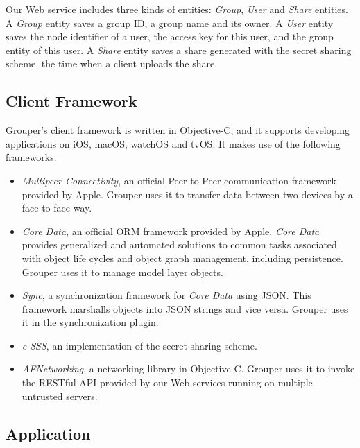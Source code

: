 \documentclass[twocolumn,10pt]{article}
\begin{document}
Our Web service includes three kinds of entities: \emph{Group}, \emph{User} and \emph{Share} entities. 
A \emph{Group} entity saves a group ID, a group name and its owner. 
A \emph{User} entity saves the node identifier of a user, the access key for this user, and the group entity of this user. 
A \emph{Share} entity saves a share generated with the secret sharing scheme, the time when a client uploads the share. 

\subsection{Client Framework}

Grouper's client framework is written in Objective-C, and it supports developing applications on iOS, macOS, watchOS and tvOS.
It makes use of the following frameworks.   

\begin{itemize}
	\setlength{\itemsep}{1pt}
	\setlength{\parskip}{0pt}
	\setlength{\parsep}{0pt}
	\item 
	\emph{Multipeer Connectivity}\cite{mc},  an official Peer-to-Peer communication framework provided by Apple. 
	Grouper uses it to transfer data between two devices by a face-to-face way.
	\item 
	\emph{Core Data}\cite{coredata}, an official ORM framework provided by Apple.
	\emph{Core Data} provides generalized and automated solutions to common tasks associated with object life cycles and object graph management, including persistence. 
	Grouper uses it to manage model layer objects. 
	\item 
	\emph{Sync}, a synchronization framework for \emph{Core Data} using JSON. 
	This framework marshalls objects into JSON strings and vice versa. 
	Grouper uses it in the synchronization plugin.
	\item 
	\emph{c-SSS}\cite{c-sss}, an implementation of the secret sharing scheme.
	\item 
	\emph{AFNetworking}\cite{afnetworking}, a networking library in Objective-C. 
	Grouper uses it to invoke the RESTful API provided by our Web services running on multiple untrusted servers. 
\end{itemize}

\subsection{Application}
\end{document}
